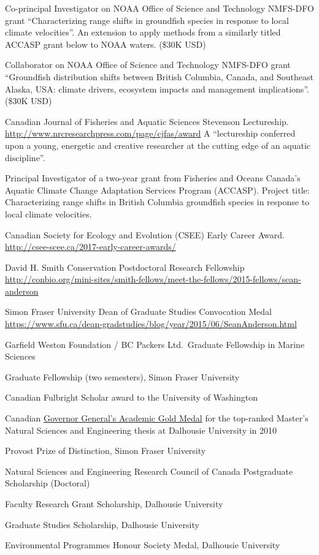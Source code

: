 \begin{description}
\tightlist
\item[2020--21]
Co-principal Investigator on NOAA Office of Science and Technology
NMFS-DFO grant ``Characterizing range shifts in groundfish species in
response to local climate velocities''. An extension to apply methods
from a similarly titled ACCASP grant below to NOAA waters. (\$30K USD)
\item[2020--21]
Collaborator on NOAA Office of Science and Technology NMFS-DFO grant
``Groundfish distribution shifts between British Columbia, Canada, and
Southeast Alaska, USA: climate drivers, ecosystem impacts and management
implications''. (\$30K USD)
\item[2019]
Canadian Journal of Fisheries and Aquatic Sciences Stevenson
Lectureship. \url{http://www.nrcresearchpress.com/page/cjfas/award} A
``lectureship conferred upon a young, energetic and creative researcher
at the cutting edge of an aquatic discipline''.
\item[2018--20]
Principal Investigator of a two-year grant from Fisheries and Oceans
Canada's Aquatic Climate Change Adaptation Services Program (ACCASP).
Project title: Characterizing range shifts in British Columbia
groundfish species in response to local climate velocities.
\item[2017]
Canadian Society for Ecology and Evolution (CSEE) Early Career Award.\\
\url{http://csee-scee.ca/2017-early-career-awards/}
\item[2015]
David H. Smith Conservation Postdoctoral Research Fellowship\\
\url{http://conbio.org/mini-sites/smith-fellows/meet-the-fellows/2015-fellows/sean-anderson}
\item[2015]
Simon Fraser University Dean of Graduate Studies Convocation Medal\\
\url{https://www.sfu.ca/dean-gradstudies/blog/year/2015/06/SeanAnderson.html}
\item[2014]
Garfield Weston Foundation / BC Packers Ltd.\ Graduate Fellowship in
Marine Sciences
\item[2014]
Graduate Fellowship (two semesters), Simon Fraser University
\item[2012--13]
Canadian Fulbright Scholar award to the University of Washington
\item[2011]
Canadian \href{http://goo.gl/nA1zE}{Governor General's Academic Gold
Medal} for the top-ranked Master's Natural Sciences and Engineering
thesis at Dalhousie University in 2010
\item[2011--14]
Provost Prize of Distinction, Simon Fraser University
\item[2011--14]
Natural Sciences and Engineering Research Council of Canada Postgraduate
Scholarship (Doctoral)
\item[2007--10]
Faculty Research Grant Scholarship, Dalhousie University
\item[2007--09]
Graduate Studies Scholarship, Dalhousie University
\item[2007]
Environmental Programmes Honour Society Medal, Dalhousie University
\end{description}

